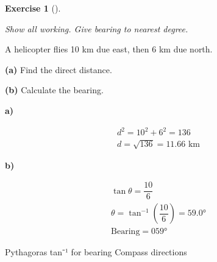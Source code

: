 \documentclass[
  letterpaper,
  DIV=11,
  numbers=noendperiod]{scrreprt}
\theoremstyle{definition}
\newtheorem{exercise}{Exercise}[chapter]
\theoremstyle{remark}
\begin{document}
\begin{exercise}[]\protect\hypertarget{exr-trig-29}{}\label{exr-trig-29}

\emph{Show all working. Give bearing to nearest degree.}

A helicopter flies 10 km due east, then 6 km due north.

\textbf{(a)} Find the direct distance.

\textbf{(b)} Calculate the bearing.

\begin{tcolorbox}[enhanced jigsaw, opacitybacktitle=0.6, coltitle=black, arc=.35mm, colframe=quarto-callout-tip-color-frame, colback=white, bottomrule=.15mm, left=2mm, colbacktitle=quarto-callout-tip-color!10!white, titlerule=0mm, opacityback=0, title=\textcolor{quarto-callout-tip-color}{\faLightbulb}\hspace{0.5em}{🔍 View Solution}, leftrule=.75mm, breakable, rightrule=.15mm, bottomtitle=1mm, toptitle=1mm, toprule=.15mm]

\textbf{a)}

\[
\begin{aligned}
d^2 = 10^2 + 6^2 = 136 \\ d = \sqrt{136} = 11.66 \text{ km}
\end{aligned}
\]

\textbf{b)}

\[
\begin{aligned}
\tan\theta = \dfrac{10}{6} \\ \theta = \tan^{-1}\!\left(\dfrac{10}{6}\right) = 59.0° \\ \text{Bearing} = 059°
\end{aligned}
\]

\end{tcolorbox}

{Pythagoras} {tan⁻¹ for bearing} {Compass directions}

\end{exercise}
\end{document}
